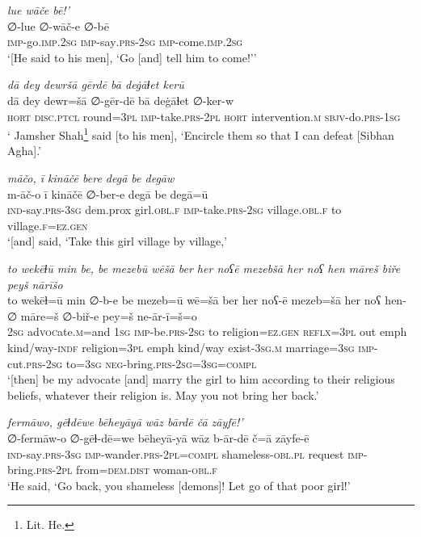 \ea \label{DP.43}
\textit{lue wāče bē!’} \\ 
\gll ∅-lue ∅-wāč-e ∅-bē \\ 
 \textsc{imp-}go\textsc{.imp}\textsc{.\textsc{2sg}} \textsc{imp-}say\textsc{.prs-}\textsc{2sg} \textsc{imp-}come\textsc{.imp}\textsc{.\textsc{2sg}} \\ 
\glt `[He said to his men], ‘Go [and] tell him to come!’'
\z 
 
\ea \label{DP.51}
\textit{dā dey dewršā gērdē bā deġāɫet kerū} \\ 
\gll dā dey dewr=šā ∅-gēr-dē bā deġāɫet ∅-ker-w \\ 
 \textsc{hort} \textsc{disc.ptcl} round\textsc{=3pl} \textsc{imp-}take\textsc{.prs}\textsc{-2pl} \textsc{hort} intervention\textsc{.m} \textsc{sbjv-}do\textsc{.prs}\textsc{-1sg} \\ 
\glt ` Jamsher Shah\footnote{Lit. He.} said [to his men], ‘Encircle them so that I can defeat [Sibhan Agha].'
\z 
 
\ea \label{ZP.39}
\textit{māčo, ī kināčē bere degā be degāw} \\ 
\gll m-āč-o ī kināčē ∅-ber-e degā be degā=ū \\ 
 \textsc{ind-}say\textsc{.prs}\textsc{-3sg} dem.prox girl\textsc{.obl}\textsc{.f} \textsc{imp-}take\textsc{.prs}-\textsc{2sg} village\textsc{.obl}\textsc{.f} to village\textsc{.f}\textsc{\textsc{=ez.gen}} \\ 
\glt `[and] said, ‘Take this girl village by village,'
\z 
 
\ea \label{ZP.47}
\textit{to wekēɫū min be, be mezebū wēšā ber her noʕē mezebšā her noʕ hen māreš biře peyš nārīšo} \\ 
\gll to wekēɫ=ū min ∅-b-e be mezeb=ū wē=šā ber her noʕ-ē mezeb=šā her noʕ hen-∅ māre=š ∅-biř-e pey=š ne-ār-ī=š=o \\ 
 \textsc{2sg} ad\textsc{voc}ate\textsc{.m}=and \textsc{1sg} \textsc{imp-}be\textsc{.prs}-\textsc{2sg} to religion\textsc{\textsc{=ez.gen}} \textsc{reflx}\textsc{=3pl} out emph kind/way\textsc{-indf} religion\textsc{=3pl} emph kind/way exist\textsc{-3sg}\textsc{.m} marriage\textsc{=3sg} \textsc{imp-}cut\textsc{.prs}-\textsc{2sg} to\textsc{=3sg} \textsc{neg-}bring\textsc{.prs}\textsc{-2sg}\textsc{=3sg}\textsc{=compl} \\ 
\glt `[then] be my advocate [and] marry the girl to him according to their religious beliefs, whatever their religion is. May you not bring her back.'
\z 
 
\ea \label{ZP.70}
\textit{fermāwo, gēɫdēwe bēheyāyā wāz bārdē čā zāyfē!’} \\ 
\gll ∅-fermāw-o ∅-gēɫ-dē=we bēheyā-yā wāz b-ār-dē č=ā zāyfe-ē \\ 
 \textsc{ind-}say\textsc{.prs}\textsc{-3sg} \textsc{imp-}wander\textsc{.prs}-\textsc{2pl}\textsc{=compl} shameless\textsc{-obl}\textsc{.pl} request \textsc{imp-}bring\textsc{.prs}-\textsc{2pl} from=\textsc{dem.dist} woman\textsc{-obl}\textsc{.f} \\ 
\glt `He said, ‘Go back, you shameless [demons]! Let go of that poor girl!'
\z 
 
